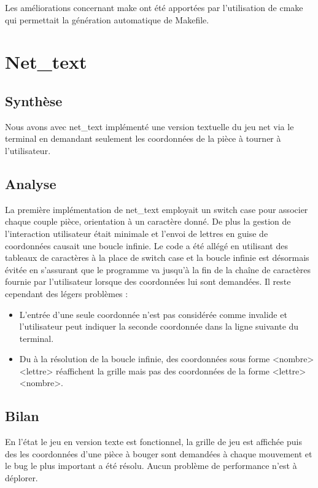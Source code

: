 \documentclass[12pt]{article}
\begin{document}
Les améliorations concernant make ont été apportées par l'utilisation de cmake qui permettait la 
génération automatique de Makefile.



\section{Net\_text}
\subsection{Synthèse}

Nous avons avec net\_text implémenté une version textuelle du jeu net via le terminal en demandant
seulement les coordonnées de la pièce à tourner à l'utilisateur.

\subsection{Analyse}

La première implémentation de net\_text employait un switch case pour associer chaque couple 
pièce, orientation à un caractère donné. De plus la gestion de l'interaction utilisateur 
était minimale et l'envoi de lettres en guise de coordonnées causait une boucle infinie.
Le code a été allégé en utilisant des tableaux de caractères à la place de switch case et 
la boucle infinie est désormais évitée en s'assurant que le programme va jusqu'à la fin de 
la chaîne de caractères fournie par l'utilisateur lorsque des coordonnées lui sont demandées.
Il reste cependant des légers problèmes : 
\begin{itemize}
\item L'entrée d'une seule coordonnée n'est pas considérée comme invalide et l'utilisateur peut indiquer la seconde coordonnée dans la ligne suivante du terminal.
\item Du à la résolution de la boucle infinie, des coordonnées sous forme <nombre> <lettre> réaffichent la grille mais pas des coordonnées de la forme <lettre> <nombre>.
\end{itemize}

\subsection{Bilan}

En l'état le jeu en version texte est fonctionnel, la grille de jeu est affichée puis des 
les coordonnées d'une pièce à bouger sont demandées à chaque mouvement et le bug le plus 
important a été résolu. Aucun problème de performance n'est à déplorer.
\end{document}
